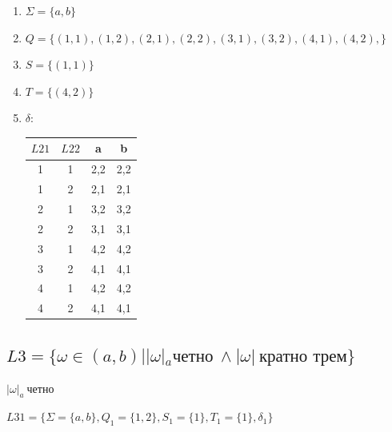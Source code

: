 \documentclass[a4paper,12pt]{article}
\begin{document}
        \begin{enumerate}
        \item $\Sigma = \{a, b\}$
        \item $Q = \{(1, 1), (1, 2), (2, 1), (2, 2), (3, 1), (3, 2), (4, 1), (4, 2), \}$
        \item $S = \{(1, 1)\}$
        \item $T = \{(4,2)\}$
        \item $\delta:$
 \begin{center}
      \begin{tabular}{ | c | c | c | c | }
\hline
$L21$ & $L22$ & a & b \\ \hline
 1 & 1 & 2,2 & 2,2 \\
 1 & 2 & 2,1 & 2,1 \\
 2 & 1 & 3,2 & 3,2 \\
 2 & 2 & 3,1 & 3,1 \\
 3 & 1 & 4,2 & 4,2 \\
 3 & 2 & 4,1 & 4,1 \\
 4 & 1 & 4,2 & 4,2 \\
 4 & 2 & 4,1 & 4,1 \\
\hline
\end{tabular} 
\end{center}
    \begin{center}
    \end{center}
\end{enumerate}

\subsection{$L3 = \{\omega \in (a,b)| |\omega|_{a} \texttt{четно}\: \land |\omega|\: \texttt{кратно трем}\}$}

$|\omega|_{a} \: \text{четно} $

$L31= \{\Sigma = \{a, b\}, Q_1 = \{1, 2\},S_1 = \{1\}, T_1 = \{1\}, \delta_1 \}$
\end{document}

